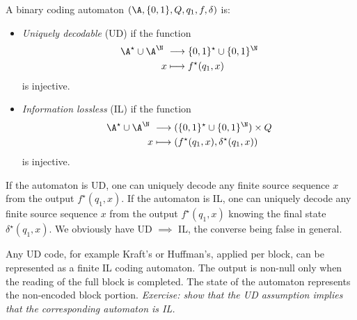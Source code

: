 \documentclass[toc]{../cs-classes/cs-classes}
\begin{document}
\begin{definition}
    A binary coding automaton $(\A, \{0, 1\}, Q, q_1, f, \delta)$ is:
    \begin{itemize}
        \item \emph{Uniquely decodable} (UD) if the function
        \begin{equation*}
            \begin{aligned}
               \A^\star \cup \A^\N &\longrightarrow \{0, 1\}^\star \cup \{0, 1\}^\N\\
                x &\longmapsto f^\star(q_1, x)
            \end{aligned}
        \end{equation*}
        is injective.
        \item \emph{Information lossless} (IL) if the function
        \begin{equation*}
            \begin{aligned}
                \A^\star \cup \A^\N &\longrightarrow (\{0, 1\}^\star \cup \{0, 1\}^\N) \times Q\\
                x &\longmapsto (f^\star(q_1, x), \delta^\star(q_1, x))
            \end{aligned}
        \end{equation*}
        is injective.
    \end{itemize}
\end{definition}

\begin{remark}
    If the automaton is UD, one can uniquely decode any finite source sequence $x$ from the output $f^\star(q_1, x)$. If the automaton is IL, one can uniquely decode any finite source sequence $x$ from the output $f^\star(q_1, x)$ knowing the final state $\delta^\star(q_1, x)$. We obviously have UD $\implies$ IL, the converse being false in general.
\end{remark}

\begin{example}
    Any UD code, for example Kraft's or Huffman's, applied per block, can be represented as a finite IL coding automaton. The output is non-null only when the reading of the full block is completed. The state of the automaton represents the non-encoded block portion. \emph{Exercise: show that the UD assumption implies that the corresponding automaton is IL.}
\end{example}
\end{document}

